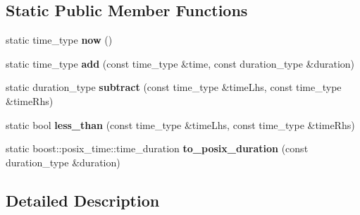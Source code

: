 \subsection*{Static Public Member Functions}
\begin{DoxyCompactItemize}
\item 
static time\+\_\+type {\bfseries now} ()\hypertarget{structboost_1_1asio_1_1time__traits_3_01ndn_1_1time_1_1steady__clock_01_4_af3e62cbf012d898977b728ba953c7731}{}\label{structboost_1_1asio_1_1time__traits_3_01ndn_1_1time_1_1steady__clock_01_4_af3e62cbf012d898977b728ba953c7731}

\item 
static time\+\_\+type {\bfseries add} (const time\+\_\+type \&time, const duration\+\_\+type \&duration)\hypertarget{structboost_1_1asio_1_1time__traits_3_01ndn_1_1time_1_1steady__clock_01_4_a745c0f76eb25b0f37386bcaf7f7ed3df}{}\label{structboost_1_1asio_1_1time__traits_3_01ndn_1_1time_1_1steady__clock_01_4_a745c0f76eb25b0f37386bcaf7f7ed3df}

\item 
static duration\+\_\+type {\bfseries subtract} (const time\+\_\+type \&time\+Lhs, const time\+\_\+type \&time\+Rhs)\hypertarget{structboost_1_1asio_1_1time__traits_3_01ndn_1_1time_1_1steady__clock_01_4_ac7026ef254b73ce7e9ff3fcaaee46f5e}{}\label{structboost_1_1asio_1_1time__traits_3_01ndn_1_1time_1_1steady__clock_01_4_ac7026ef254b73ce7e9ff3fcaaee46f5e}

\item 
static bool {\bfseries less\+\_\+than} (const time\+\_\+type \&time\+Lhs, const time\+\_\+type \&time\+Rhs)\hypertarget{structboost_1_1asio_1_1time__traits_3_01ndn_1_1time_1_1steady__clock_01_4_ab5e6ccc12f63cd0b3ff43ae0c487a43e}{}\label{structboost_1_1asio_1_1time__traits_3_01ndn_1_1time_1_1steady__clock_01_4_ab5e6ccc12f63cd0b3ff43ae0c487a43e}

\item 
static boost\+::posix\+\_\+time\+::time\+\_\+duration {\bfseries to\+\_\+posix\+\_\+duration} (const duration\+\_\+type \&duration)\hypertarget{structboost_1_1asio_1_1time__traits_3_01ndn_1_1time_1_1steady__clock_01_4_a2b986896854b040c46028c4b9216ee64}{}\label{structboost_1_1asio_1_1time__traits_3_01ndn_1_1time_1_1steady__clock_01_4_a2b986896854b040c46028c4b9216ee64}

\end{DoxyCompactItemize}


\subsection{Detailed Description}
